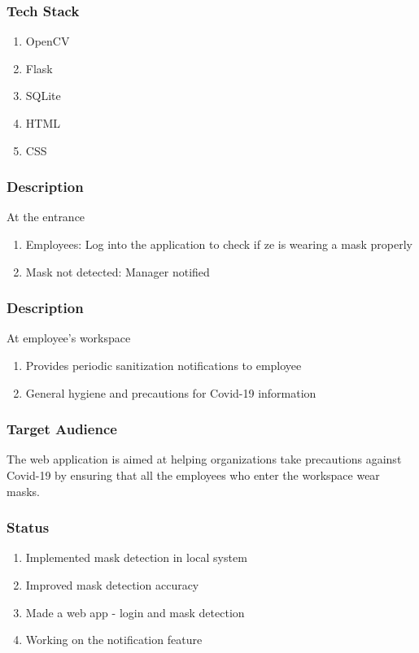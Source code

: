 \documentclass[14pt]{beamer}
\begin{document}
\begin{frame}
    \frametitle{Tech Stack}
    \begin{enumerate}
        \item OpenCV
        \item Flask
        \item SQLite
        \item HTML
        \item CSS
    \end{enumerate}
\end{frame} 

\begin{frame}
    \frametitle{Description}
    At the entrance
    \begin{enumerate}

        \item Employees: Log into the application to check if ze is wearing a mask properly

        \item Mask not detected: Manager notified
    \end{enumerate}
\end{frame}

\begin{frame}
    \frametitle{Description}
    At employee's workspace
    \begin{enumerate}
        \item Provides periodic sanitization notifications to employee
            
        \item General hygiene and precautions for Covid-19 information
    \end{enumerate}
\end{frame}

\begin{frame}
    \frametitle{Target Audience}
    The web application is  aimed at helping organizations take precautions against Covid-19 by ensuring that all the employees who enter the workspace wear masks.
\end{frame}

\begin{frame}
    \frametitle{Status}
    \begin{enumerate}
        \item Implemented mask detection in local system
        \item Improved mask detection accuracy
        \item Made a web app - login and mask detection
        \item Working on the notification feature
    \end{enumerate}
\end{frame}
\end{document}
